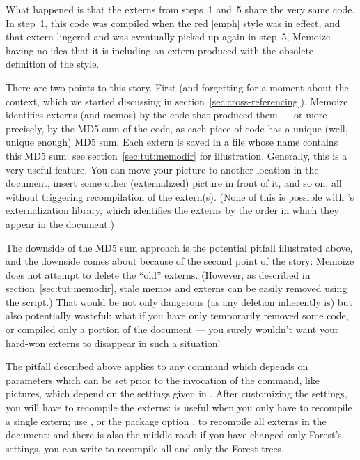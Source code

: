 \documentclass[a4paper,11pt]{article}
\begin{document}
What happened is that the externs from steps~1 and~5 share the very same code.
In step~1, this code was compiled when the red |emph| style was in effect, and
that extern lingered and was eventually picked up again in step~5, Memoize
having no idea that it is including an extern produced with the obsolete
definition of the style.

There are two points to this story.  First (and forgetting for a moment about
the context, which we started discussing in
section~\ref{sec:cross-referencing}), Memoize identifies externs (and memos) by
the code that produced them --- or more precisely, by the MD5 sum of the code,
as each piece of code has a unique (well, unique enough) MD5 sum.  Each extern
is saved in a file whose name contains this MD5 sum; see
section~\ref{sec:tut:memodir} for illustration.  Generally, this is a very
useful feature.  You can move your picture to another location in the document,
insert some other (externalized) picture in front of it, and so on, all without
triggering recompilation of the extern(s).  (None of this is possible with
\TikZ's externalization library, which identifies the externs by the order in
which they appear in the document.)

The downside of the MD5 sum approach is the potential pitfall illustrated
above, and the downside comes about because of the second point of the story:
Memoize does not attempt to delete the ``old'' externs.  (However, as described
in section~\ref{sec:tut:memodir}, stale memos and externs can be easily removed
using the  script.) That would be not only
dangerous (as any deletion inherently is) but also potentially wasteful: what
if you have only temporarily removed some code, or compiled only a portion of
the document --- you surely wouldn't want your hard-won externs to disappear in
such a situation!

The pitfall described above applies to any command which depends on parameters
which can be set prior to the invocation of the command, like \TikZ pictures,
which depend on the settings given in .  After customizing the
settings, you will have to recompile the externs:
 is useful when you only have to
recompile a single extern; use , or
the package option , to recompile all externs in the
document; and there is also the middle road: if you have changed only Forest's
settings, you can write
 to recompile
all and only the Forest trees.
\end{document}
